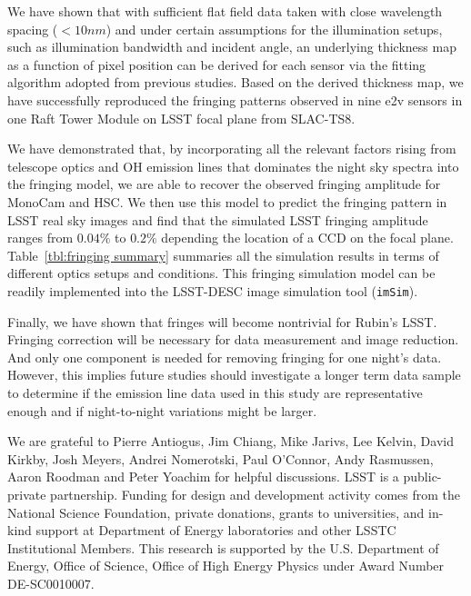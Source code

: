 \documentclass[twocolumn]{aastex63} %
\begin{document}
\begin{CJK*}{UTF8}{gbsn}
We have shown that with sufficient flat field data taken with close wavelength spacing ($< 10nm$) and under certain assumptions for the illumination setups, such as illumination bandwidth and incident angle, an underlying thickness map as a function of pixel position can be derived for each sensor via the fitting algorithm adopted from previous studies. Based on the derived thickness map, we have successfully reproduced the fringing patterns observed in nine e2v sensors in one Raft Tower Module on LSST focal plane from SLAC-TS8.

We have demonstrated that, by incorporating all the relevant factors rising from telescope optics and OH emission lines that dominates the night sky spectra into the fringing model, we are able to recover the observed fringing amplitude for MonoCam and HSC. We then use this model to predict the fringing pattern in LSST real sky images and find that the simulated LSST fringing amplitude ranges from $0.04\%$  to $0.2\%$ depending the location of a CCD on the focal plane. Table~\ref{tbl:fringing summary} summaries all the simulation results in terms of different optics setups and conditions. This fringing simulation model can be readily implemented into the LSST-DESC image simulation tool (\verb|imSim|). 

Finally, we have shown that fringes will become nontrivial for Rubin's LSST. Fringing correction will be necessary for data measurement and image reduction. And only one component is needed for removing fringing for one night's data.  However, this implies future studies should investigate a longer term data sample to determine if the emission line data used in this study are representative enough and if night-to-night variations might be larger.




\acknowledgements
We are grateful to Pierre Antiogus, Jim Chiang, Mike Jarivs, Lee Kelvin, David Kirkby, Josh Meyers, Andrei Nomerotski, Paul O'Connor, Andy Rasmussen, Aaron Roodman and Peter Yoachim for helpful discussions.
LSST is a public-private partnership. Funding for design and development activity comes from the National Science Foundation, private donations, grants to universities, and in-kind support at Department of Energy laboratories and other LSSTC Institutional Members. This research is supported by the U.S. Department of Energy, Office  of  Science,  Office  of  High  Energy  Physics  under Award Number DE-SC0010007.

\pagebreak
{}




\end{CJK*}
\end{document}
